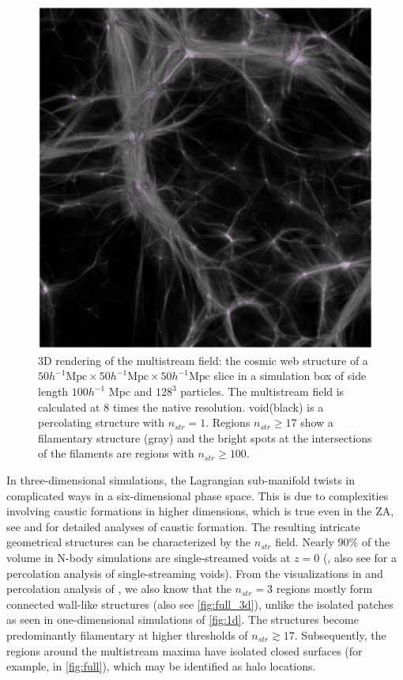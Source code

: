 \begin{figure} 
\centering\includegraphics[width=16cm]{Chapter4/Source_v2/fig1.pdf} 
\caption{3D rendering of the multistream field: the cosmic web structure of a $ 50 h^{-1} \text{Mpc} \times 50 h^{-1} \text{Mpc} \times 50 h^{-1} \text{Mpc}$ slice in a simulation box of side length $100 h^{-1}$ Mpc and $128^3$ particles. The multistream field is calculated at 8 times the native resolution. void(black) is a percolating structure with $n_{str} = 1$. Regions $n_{str} \geq 17$ show a filamentary structure (gray) and the bright spots at the intersections of the filaments are regions with $n_{str} \geq 100$. }
\label{fig:full_3d}
\end{figure}

In three-dimensional simulations, the Lagrangian sub-manifold twists in complicated ways in a six-dimensional phase space. This is due to complexities involving caustic formations in higher dimensions, which is true even in the ZA, see \citealt{Arnold1982} and \citealt{Hidding2014} for detailed analyses of caustic formation. The resulting intricate geometrical structures can be characterized by the $n_{str}$ field. Nearly  $90\%$ of the volume in N-body simulations are single-streamed voids at $z=0$ (\citealt{Shandarin2012}, also see \citealt{Falck2015} for a percolation analysis of single-streaming voids). From the visualizations in \cite{Ramachandra2015} and percolation analysis of \cite{Ramachandra2017}, we also know that the $n_{str} = 3$ regions mostly form connected wall-like structures (also see \autoref{fig:full_3d}), unlike the isolated patches as seen in one-dimensional simulations of \autoref{fig:1d}. The structures become predominantly filamentary at higher thresholds of $ n_{str} \gtrsim 17$. Subsequently, the regions around the multistream maxima have isolated closed surfaces (for example, in \autoref{fig:full}), which may be identified as halo locations. 



